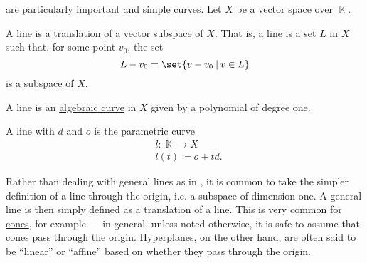 \begin{definition}\label{def:geometric_line}\mimprovised
   are particularly important and simple \hyperref[def:geometric_shape]{curves}. Let \( X \) be a vector space over \( \BbbK \).

  \begin{thmenum}
     A line is a \hyperref[def:rigid_motion/translation]{translation} of a vector subspace of \( X \). That is, a line is a set \( L \) in \( X \) such that, for some point \( v_0 \), the set
    \begin{equation*}
      L - v_0 = \set{ v - v_0 \given v \in L }
    \end{equation*}
    is a subspace of \( X \).

     A line is an \hyperref[def:affine_algebraic_set/curve]{algebraic curve} in \( X \) given by a polynomial of degree one.

     A line with  \( d \) and  \( o \) is the parametric curve
    \begin{equation*}
      \begin{aligned}
        &l: \BbbK \to X   \\
        &l(t) \coloneqq o + t d.
      \end{aligned}
    \end{equation*}
  \end{thmenum}
\end{definition}

\begin{remark}\label{rem:figure_through_origin}
  Rather than dealing with general lines as in , it is common to take the simpler definition of a line through the origin, i.e. a subspace of dimension one. A general line is then simply defined as a translation of a line. This is very common for \hyperref[def:geometric_cone]{cones}, for example --- in general, unless noted otherwise, it is safe to assume that cones pass through the origin. \hyperref[def:hyperplane]{Hyperplanes}, on the other hand, are often said to be \enquote{linear} or \enquote{affine} based on whether they pass through the origin.
\end{remark}

